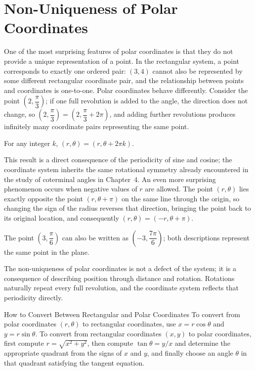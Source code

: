 \section{Non-Uniqueness of Polar Coordinates}

One of the most surprising features of polar coordinates is that they do
not provide a unique representation of a point. In the rectangular
system, a point corresponds to exactly one ordered pair: $(3,4)$ cannot
also be represented by some different rectangular coordinate pair, and
the relationship between points and coordinates is one-to-one. Polar
coordinates behave differently. Consider the point $\left(2,
\dfrac{\pi}{3}\right)$; if one full revolution is added to the angle, the
direction does not change, so $\left(2,\dfrac{\pi}{3}\right) =
\left(2,\dfrac{\pi}{3}+2\pi\right)$, and adding further revolutions
produces infinitely many coordinate pairs representing the same point.

\begin{theorem}
For any integer $k$, $(r,\theta) = (r,\theta+2\pi k)$.
\end{theorem}

This result is a direct consequence of the periodicity of sine and
cosine; the coordinate system inherits the same rotational symmetry
already encountered in the study of coterminal angles in Chapter~4. An
even more surprising phenomenon occurs when negative values of $r$ are
allowed. The point $(r,\theta)$ lies exactly opposite the point
$(r,\theta+\pi)$ on the same line through the origin, so changing the
sign of the radius reverses that direction, bringing the point back to
its original location, and consequently $(r,\theta) = (-r,\theta+\pi)$.

\begin{example}
The point $\left(3,\dfrac{\pi}{6}\right)$ can also be written as
$\left(-3,\dfrac{7\pi}{6}\right)$; both descriptions represent the same
point in the plane.
\end{example}

The non-uniqueness of polar coordinates is not a defect of the system; it
is a consequence of describing position through distance and rotation.
Rotations naturally repeat every full revolution, and the coordinate
system reflects that periodicity directly.

\begin{algorithmproc}{How to Convert Between Rectangular and Polar Coordinates}
To convert from polar coordinates $(r,\theta)$ to rectangular
coordinates, use $x = r\cos\theta$ and $y = r\sin\theta$. To convert from
rectangular coordinates $(x,y)$ to polar coordinates, first compute $r =
\sqrt{x^2+y^2}$, then compute $\tan\theta = y/x$ and determine the
appropriate quadrant from the signs of $x$ and $y$, and finally choose an
angle $\theta$ in that quadrant satisfying the tangent equation.
\end{algorithmproc}

